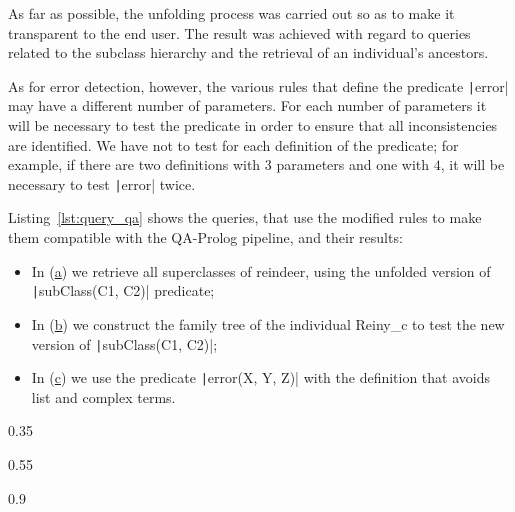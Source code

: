 As far as possible, the unfolding process was carried out so as to make it transparent to the end user. The result was achieved with regard to queries related to the subclass hierarchy and the retrieval of an individual's ancestors.

As for error detection, however, the various rules that define the predicate \texttt|error| may have a different number of parameters. For each number of parameters it will be necessary to test the predicate in order to ensure that all inconsistencies are identified. We have not to test for each definition of the predicate; for example, if there are two definitions with $3$ parameters and one with $4$, it will be necessary to test \texttt|error| twice.

Listing~\ref{lst:query_qa} shows the queries, that use the modified rules to make them compatible with the QA-Prolog pipeline, and their results:
\begin{itemize}
	\item In (\hyperref[lst:query_subclass]{a}) we retrieve all superclasses of reindeer, using the unfolded version of \texttt|subClass(C1, C2)| predicate;
	\item In (\hyperref[lst:query_ancestor]{b}) we construct the family tree of the individual Reiny\_c to test the new version of \texttt|subClass(C1, C2)|;
	\item In (\hyperref[lst:query_error]{c}) we use the predicate \texttt|error(X, Y, Z)| with the definition that avoids list and complex terms.
\end{itemize}

\begin{listingenv}[h]
	\centering
	\begin{sublisting}[c]{0.35\linewidth}
		\caption{Subclasses}
		\label{lst:query_subclass}
	\end{sublisting}
	\qquad
	\begin{sublisting}[c]{0.55\linewidth}
		\caption{Ancestor}
		\label{lst:query_ancestor}
	\end{sublisting}
	
	\vspace{.2cm}
	\begin{sublisting}[c]{0.9\linewidth}
		\caption{Error}
		\label{lst:query_error}
	\end{sublisting}
	\caption{Query results}
	\label{lst:query_qa}
\end{listingenv}

